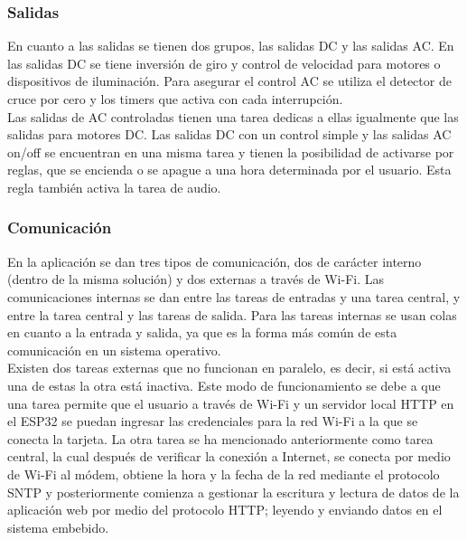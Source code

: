 \subsubsection*{Salidas}

En cuanto a las salidas se tienen dos grupos, las salidas DC y las salidas AC. En las salidas DC se tiene inversión de giro y control de velocidad para motores o dispositivos de iluminación. Para asegurar el control AC se utiliza el detector de cruce por cero y los timers que activa con cada interrupción.\\

Las salidas de AC controladas tienen una tarea dedicas a ellas igualmente que las salidas para motores DC. Las salidas DC con un control simple y las salidas AC on/off se encuentran en una misma tarea y tienen la posibilidad de activarse por reglas, que se encienda o se apague a una hora determinada por el usuario. Esta regla también activa la tarea de audio.\\


\subsubsection*{Comunicación}

En la aplicación se dan tres tipos de comunicación, dos de carácter interno (dentro de la misma solución) y dos externas a través de Wi-Fi. Las comunicaciones internas se dan entre las tareas de entradas y una tarea central, y entre la tarea central y las tareas de salida. Para las tareas internas se usan colas en cuanto a la entrada y salida, ya que es la forma más común de esta comunicación en un sistema operativo.\\ 

Existen dos tareas externas que no funcionan en paralelo, es decir, si está activa una de estas la otra está inactiva. Este modo de funcionamiento se debe a que una tarea permite que el usuario a través de Wi-Fi y un servidor local HTTP en el ESP32 se puedan ingresar las credenciales para la red Wi-Fi a la que se conecta la tarjeta. La otra tarea se ha mencionado anteriormente como tarea central, la cual después de verificar la conexión a Internet, se conecta por medio de Wi-Fi al módem, obtiene la hora y la fecha de la red mediante el protocolo SNTP y posteriormente comienza a gestionar la escritura y lectura de datos de la aplicación web por medio del protocolo HTTP; leyendo y enviando datos en el sistema embebido.\\


